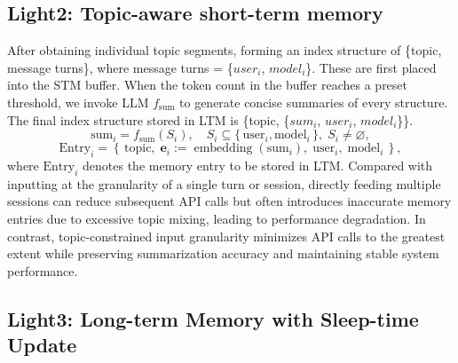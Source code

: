 \subsection{Light2: Topic-aware short-term memory}
\label{STM}
After obtaining individual topic segments, forming an index structure of \{topic, message turns\}, where message turns = \{$user_i$, $model_i$\}. 
These are first placed into the STM buffer. When the token count in the buffer reaches a preset threshold, we invoke LLM $f_{\text{sum}}$ to generate concise summaries of every structure. 
The final index structure stored in LTM is \{topic, \{$sum_i$, $user_i$, $model_i$\}\}. 
\[
\mathrm{sum}_i = f_{\mathrm{sum}}\!\left(S_i\right), \quad 
S_i \subseteq \{\, \mathrm{user}_i, \mathrm{model}_i \,\}, \; S_i \neq \varnothing,
\]
\[
\mathrm{Entry}_i = \left\{\, \mathrm{topic},\; \mathbf{e}_i := \operatorname{embedding}(\mathrm{sum}_i),\; \mathrm{user}_i,\; \mathrm{model}_i \,\right\},
\]
\noindent where $\mathrm{Entry}_i$ denotes the memory entry to be stored in LTM.
Compared with inputting at the granularity of a single turn or session, directly feeding multiple sessions can reduce subsequent API calls but often introduces inaccurate memory entries due to excessive topic mixing, leading to performance degradation. 
In contrast, topic-constrained input granularity minimizes API calls to the greatest extent while preserving summarization accuracy and maintaining stable system performance. 

\subsection{Light3: Long-term Memory with Sleep-time Update}
\label{LTM}

